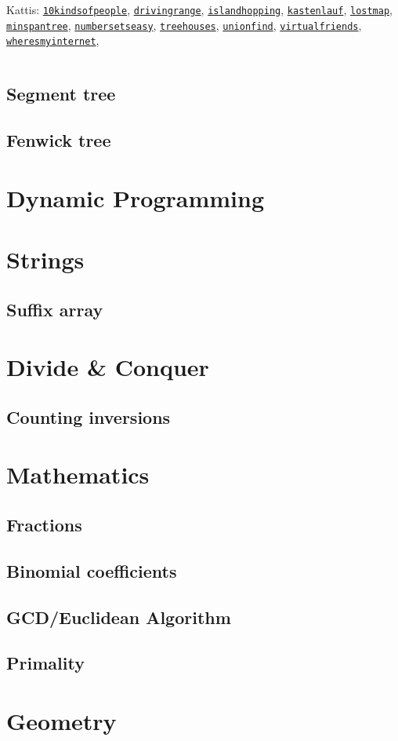 \documentclass{article}
\newcommand{\code}[1]{\inputminted[fontsize=\normalsize]{java}{code/#1}}
\newcommand{\kattis}[1]{\href{https://open.kattis.com/problems/#1}{\texttt{#1}}}
\begin{document}
Kattis: \kattis{10kindsofpeople}, \kattis{drivingrange},
\kattis{islandhopping}, \kattis{kastenlauf}, \kattis{lostmap},
\kattis{minspantree}, \kattis{numbersetseasy}, \kattis{treehouses},
\kattis{unionfind}, \kattis{virtualfriends},
\kattis{wheresmyinternet},

\code{data-structures/UnionFind.java}

\subsection{Segment tree}

\subsection{Fenwick tree}

\section{Dynamic Programming}

\section{Strings}

\subsection{Suffix array}

\section{Divide \& Conquer}

\subsection{Counting inversions}

\section{Mathematics}

\subsection{Fractions}

\subsection{Binomial coefficients}

\subsection{GCD/Euclidean Algorithm}

\subsection{Primality}

\section{Geometry}
\end{document}
